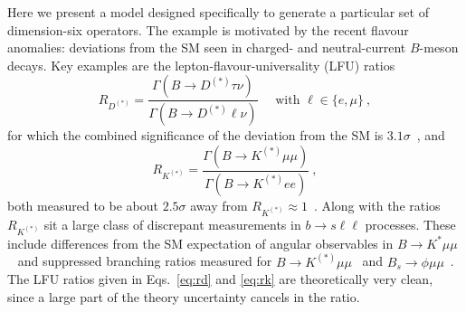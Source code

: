 Here we present a model designed specifically to generate a particular set of
dimension-six operators. The example is motivated by the recent flavour
anomalies: deviations from the SM seen in charged- and neutral-current $B$-meson
decays. Key examples are the lepton-flavour-universality (LFU)
ratios~\cite{Lees:2012xj, Lees:2013uzd, Huschle:2015rga, Hirose:2016wfn,
  Abdesselam:2016cgx, Aaij:2017tyk, Aaij:2017uff}
\begin{equation}
  \label{eq:rd}
  R_{D^{(*)}} = \frac{\Gamma(B \to D^{(*)} \tau \nu)}{\Gamma(B \to D^{(*)} \ell \nu)}\quad \text{ with } \ell \in \{e, \mu\}  \ ,
\end{equation}
for which the combined significance of the deviation from the SM is
$3.1\sigma$~\cite{Amhis:2019ckw}, and
\begin{equation}
  \label{eq:rk}
  R_{K^{(*)}} = \frac{\Gamma(B \to K^{(*)} \mu \mu)}{\Gamma(B \to K^{(*)} e e)} \ ,
\end{equation}
both measured to be about $2.5\sigma$ away from
$R_{K^{(*)}} \approx 1$~\cite{Aaij:2019wad, Aaij:2017vbb}. Along with the ratios
$R_{K^{(*)}}$ sit a large class of discrepant measurements in
$b \to s \ell \ell$ processes. These include differences from the SM expectation
of angular observables in $B \to K^{*} \mu \mu$~\cite{Aaij:2015oid,
  ATLAS-CONF-2017-023, CMS-PAS-BPH-15-008, Khachatryan:2015isa} and suppressed
branching ratios measured for $B \to K^{(*)} \mu\mu$~\cite{Aaij:2014pli} and
$B_{s} \to \phi\mu \mu$~\cite{Aaij:2015esa}. The LFU ratios given in
Eqs.~\eqref{eq:rd} and \eqref{eq:rk} are theoretically very clean, since a large
part of the theory uncertainty cancels in the ratio.

